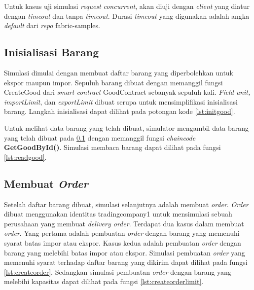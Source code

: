 Untuk kasus uji simulasi \textit{request} \textit{concurrent}, akan diuji dengan \textit{client} yang diatur dengan \textit{timeout} dan tanpa \textit{timeout}. Durasi \textit{timeout} yang digunakan adalah angka \textit{default} dari \textit{repo} fabric-samples.

\subsection{Inisialisasi Barang}
\label{subsec:init-good}
Simulasi dimulai dengan membuat daftar barang yang diperbolehkan untuk ekspor maupun impor. Sepuluh barang dibuat dengan memanggil fungsi CreateGood dari \textit{smart contract} GoodContract sebanyak sepuluh kali. \textit{Field} \textit{unit, importLimit}, dan \textit{exportLimit} dibuat serupa untuk mensimplifikasi inisialisasi barang. Langkah inisialisasi dapat dilihat pada potongan kode \ref{lst:initgood}.



Untuk melihat data barang yang telah dibuat, simulator mengambil data barang yang telah dibuat pada \ref{subsec:init-good} dengan memanggil fungsi \textit{chaincode} \textbf{GetGoodById()}. Simulasi membaca barang dapat dilihat pada fungsi \ref{lst:readgood}.



\subsection{Membuat \textit{Order}}
Setelah daftar barang dibuat, simulasi selanjutnya adalah membuat \textit{order}. \textit{Order} dibuat menggunakan identitas tradingcompany1 untuk mensimulasi sebuah perusahaan yang membuat \textit{delivery order}. Terdapat dua kasus dalam membuat \textit{order}. Yang pertama adalah pembuatan \textit{order} dengan barang yang memenuhi syarat batas impor atau ekspor. Kasus kedua adalah pembuatan \textit{order} dengan barang yang melebihi batas impor atau ekspor. Simulasi pembuatan \textit{order} yang memenuhi syarat terhadap daftar barang yang dikirim dapat dilihat pada fungsi \ref{lst:createorder}. Sedangkan simulasi pembuatan \textit{order} dengan barang yang melebihi kapasitas dapat dilihat pada fungsi \ref{lst:createorderlimit}.




